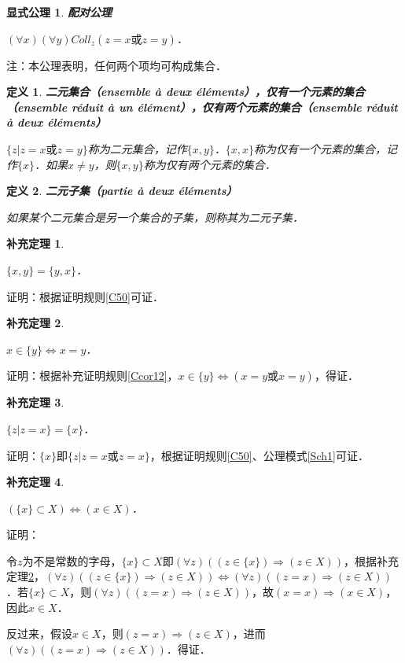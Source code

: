 \documentclass[12pt, a4paper, oneside]{book}
\newtheorem{ex}{显式公理}
\newtheorem{cor}{补充定理}
\newtheorem{de}{定义}
\begin{document}
			\begin{ex}\label{ex2}
				\textbf{配对公理}
				\par
				$(\forall x)(\forall y) Coll_z(z=x\text{或}z=y)$．
			\end{ex}
			注：本公理表明，任何两个项均可构成集合．

			\begin{de}
				\textbf{二元集合（ensemble à deux éléments），仅有一个元素的集合（ensemble réduit à un élément），仅有两个元素的集合（ensemble réduit à deux éléments）}
				\par
				$\{z|z=x或z=y\}$称为二元集合，记作$\{x, y\}$．$\{x, x\}$称为仅有一个元素的集合，记作$\{x\}$．如果$x\neq y$，则$\{x, y\}$称为仅有两个元素的集合．
			\end{de}

			\begin{de}
				\textbf{二元子集（partie à deux éléments）}
				\par
				如果某个二元集合是另一个集合的子集，则称其为二元子集．
			\end{de}

			\begin{cor}\label{cor5}
				\hfill\par
				$\{x, y\}=\{y, x\}$．
			\end{cor}
			证明：根据证明规则\ref{C50}可证．

			\begin{cor}\label{cor6}
				\hfill\par
				$x\in \{y\}\Leftrightarrow x=y$．
			\end{cor}
			证明：根据补充证明规则\ref{Ccor12}，$x\in \{y\}\Leftrightarrow (x=y或x=y)$，得证．

			\begin{cor}\label{cor7}
				\hfill\par
				$\{z|z=x\}=\{x\}$．
			\end{cor}
			证明：$\{x\}$即$\{z|z=x\text{或}z=x\}$，根据证明规则\ref{C50}、公理模式\ref{Sch1}可证．
			
			\begin{cor}\label{cor8}
				\hfill\par
				$(\{x\}\subset X)\Leftrightarrow (x\in X)$．
			\end{cor}
			证明：
			\par
			令$z$为不是常数的字母，$\{x\}\subset X$即$(\forall z)((z\in \{x\})\Rightarrow (z\in X))$，根据补充定理\ref{cor6}，$(\forall z)((z\in \{x\})\Rightarrow (z\in X))\Leftrightarrow (\forall z)((z=x)\Rightarrow (z\in X))$．若$\{x\}\subset X$，则$(\forall z)((z=x)\Rightarrow (z\in X))$，故$(x=x)\Rightarrow (x\in X)$，因此$x\in X$．
			\par
			反过来，假设$x\in X$，则$(z=x)\Rightarrow (z\in X)$，进而$(\forall z)((z=x)\Rightarrow (z\in X))$．得证．
\end{document}
